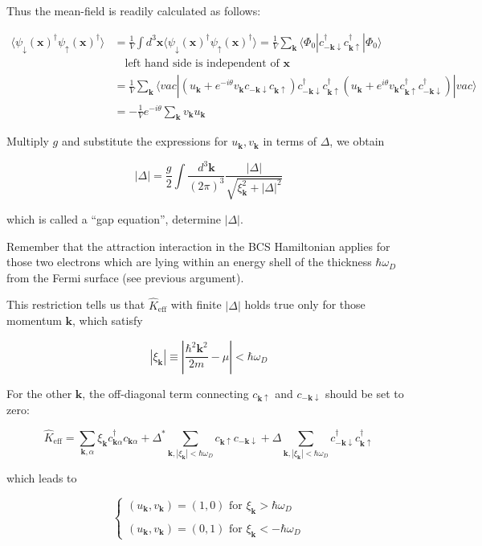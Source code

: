 Thus the mean-field is readily calculated as follows: %

\[\begin{split}
\langle\psi_{\downarrow}(\bm{x})^\dagger\psi_{\uparrow}(\bm{x})^\dagger\rangle &= \frac{1}{V}\int d^3 \bm{x} \langle\psi_{\downarrow}(\bm{x})^\dagger\psi_{\uparrow}(\bm{x})^\dagger\rangle = \frac{1}{V} \sum_{\bm{k}}\langle\Phi_0|c_{-\bm{k}\downarrow}^\dagger c_{\bm{k}\uparrow}^\dagger|\Phi_0\rangle \\
&\quad\text{left hand side is independent of }\bm{x}\\
&= \frac{1}{V}\sum_{\bm{k}}\langle vac|(u_{\bm{k}}+e^{-i\theta}v_{\bm{k}}c_{-\bm{k}\downarrow}c_{\bm{k}\uparrow})c_{-\bm{k}\downarrow}^\dagger c_{\bm{k}\uparrow}^\dagger (u_{\bm{k}}+e^{i\theta}v_{\bm{k}}c_{\bm{k}\uparrow}^\dagger c_{-\bm{k}\downarrow}^\dagger)|vac\rangle\\
&= -\frac{1}{V}e^{-i\theta}\sum_{\bm{k}}v_{\bm{k}}u_{\bm{k}}
\end{split}\]

Multiply $g$ and substitute the expressions for $u_{\bm{k}}, v_{\bm{k}}$ in terms of $\Delta$, we obtain

\[|\Delta| = \frac{g}{2}\int \frac{d^3 \bm{k}}{(2\pi)^3}\frac{|\Delta|}{\sqrt{\xi_{\bm{k}}^2+|\Delta|^2}} \]

which is called a ``gap equation'', determine $|\Delta|$. 

Remember that the attraction interaction in the BCS Hamiltonian applies for those two electrons which are lying within an energy shell of the thickness $\hbar \omega_D$ from the Fermi surface (see previous argument).

This restriction tells us that $\hat{K}_{\text{eff}}$ with finite $|\Delta|$ holds true only for those momentum $\bm{k}$, which satisfy

\[|\xi_{\bm{k}}| \equiv |\frac{\hbar^2 \bm{k}^2}{2m}-\mu|<\hbar \omega_D \]

For the other $\bm{k}$, the off-diagonal term connecting $c_{\bm{k}\uparrow}$ and $c_{-\bm{k}\downarrow}$ should be set to zero:

\[\hat{K}_{\text{eff}}=\sum_{\bm{k},\alpha}\xi_{\bm{k}}c_{\bm{k}\alpha}^\dagger c_{\bm{k}\alpha}+\Delta^* \sum_{\bm{k},|\xi_{\bm{k}}|<\hbar\omega_D}c_{\bm{k}\uparrow}c_{-\bm{k}\downarrow}+\Delta\sum_{\bm{k},|\xi_{\bm{k}}|<\hbar\omega_D}c_{-\bm{k}\downarrow}^\dagger c_{\bm{k}\uparrow}^\dagger \]

which leads to

\[\begin{cases}
 (u_{\bm{k}},v_{\bm{k}}) = (1,0)\text{ for }\xi_{\bm{k}}>\hbar\omega_D\\
\ \\
(u_{\bm{k}},v_{\bm{k}}) = (0,1)\text{ for }\xi_{\bm{k}}<-\hbar\omega_D
\end{cases}\]

